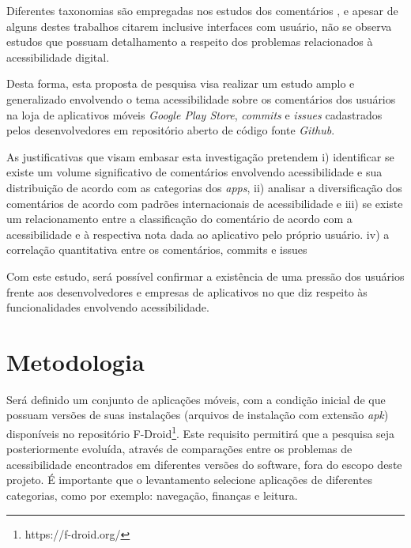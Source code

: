 \documentclass[
	12pt,				%
	oneside,			%
	a4paper,			%
	english,			%
	brazil				%
	]{abntex2ppgsi}
\begin{document}
Diferentes taxonomias são empregadas nos estudos dos comentários \cite{Ciurumelea2017analyzing,Sorbo2017surf,Iacob2013retrieving,Iacob2014online,Li2018MobileAE,Mcilroy2016analyzing,Ortega2015thesis,Pagano2013userfeedback,Panichella2015how,Pelloni2018becloma}, e apesar de alguns destes trabalhos citarem inclusive interfaces com usuário, não se observa estudos que possuam detalhamento a respeito dos problemas relacionados à acessibilidade digital.

Desta forma, esta proposta de pesquisa visa realizar um estudo amplo e generalizado envolvendo o tema acessibilidade sobre os comentários dos usuários na loja de aplicativos móveis \textit{Google Play Store}, \textit{commits} e \textit{issues} cadastrados pelos desenvolvedores em repositório aberto de código fonte \textit{Github}.

As justificativas que visam embasar esta investigação pretendem 
i) identificar se existe um volume significativo de comentários envolvendo acessibilidade e sua distribuição de acordo com as categorias dos \textit{apps},
ii) analisar a diversificação dos comentários de acordo com padrões internacionais de acessibilidade \cite{bbc} e
iii) se existe um relacionamento entre a classificação do comentário de acordo com a acessibilidade e à respectiva nota dada ao aplicativo pelo próprio usuário.
iv) a correlação quantitativa entre os comentários, commits e issues

Com este estudo, será possível confirmar a existência de uma pressão dos usuários frente aos desenvolvedores e empresas de aplicativos no que diz respeito às funcionalidades envolvendo acessibilidade.


\section{Metodologia}


Será definido um conjunto de aplicações móveis, com a condição inicial de que possuam versões de suas instalações (arquivos de instalação com extensão \textit{apk}) disponíveis no repositório F-Droid\footnote{https://f-droid.org/}. Este requisito permitirá que a pesquisa seja posteriormente evoluída, através de comparações entre os problemas de acessibilidade encontrados em diferentes versões do software, fora do escopo deste projeto. É importante que o levantamento selecione aplicações de diferentes categorias, como por exemplo: navegação, finanças e leitura.
\end{document}
